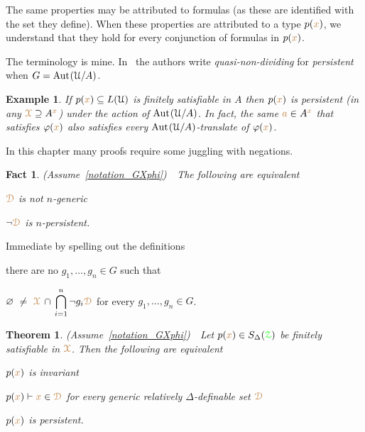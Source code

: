 \documentclass[10pt,openany]{amsproc}
\makeatletter
\newcommand{\mylabel}[1]{{\ssf{#1}}\hfill}
\renewenvironment{itemize}
  {\begin{list}{}{%
   \setlength{\parskip}{0mm}
   \setlength{\topsep}{.2\baselineskip}
   \setlength{\rightmargin}{0mm}
   \setlength{\listparindent}{0mm}
   \setlength{\itemindent}{0mm}
   \setlength{\labelwidth}{2ex}
   \setlength{\itemsep}{.1\baselineskip}
   \setlength{\parsep}{0mm}
   \setlength{\partopsep}{0mm}
   \setlength{\labelsep}{1ex}
   \setlength{\leftmargin}{\labelwidth+\labelsep}
   \let\makelabel\mylabel
   }}
   {\vspace*{-.3\baselineskip}\end{list}}
\def\proves{\vdash}
\def\Aut{{\rm Aut\kern.15ex}}
\def\D{\EuScript D}
\def\X{\EuScript X}
\def\Z{\EuScript Z}
\def\U{\EuScript U}
\def\0{\varnothing}
\def\phi{\varphi}
\def\ssf#1{\textsf{\small #1}}
\newcounter{thm}
\theoremstyle{mio}
\newtheorem{theorem}[thm]{Theorem}\tcolorboxenvironment{theorem}{mythm}
\newtheorem{fact}[thm]{Fact}\tcolorboxenvironment{fact}{mythm}
\newtheorem{example}[thm]{Example}\tcolorboxenvironment{example}{mythm}
\providecommand{\proofNameStyle}{\bfseries}
\renewenvironment{proof}[1][\proofname]{\par
  \pushQED{\qed}%
  \normalfont%
  \trivlist
  \item[\hskip\labelsep
        \proofNameStyle
    #1\@addpunct{.}]\ignorespaces
}{%
  \popQED\endtrivlist\@endpefalse
}
\def\mr{\color{brown}}
\def\gr{\color{green}}
\def\mrD{{\mr\D}}
\def\mrX{{\mr\X}}
\def\grZ{{\gr\Z}}
\makeatother
\begin{document}
The same properties may be attributed to formulas (as these are identified with the set they define).
When these properties are attributed to a type $p({\mr x})$, we understand that they hold for every conjunction of formulas in $p({\mr x})$.

The terminology is mine.
In~\cite{CK} the authors write \textit{quasi-non-dividing\/} for \textit{persistent\/} when $G=\Aut(\U/A)$.

\begin{example}
  If $p({\mr x})\subseteq L(\U)$ is finitely satisfiable in $A$ then $p({\mr x})$ is persistent (in any $\mrX\supseteq A^{\mr x}$) under the action of $\Aut(\U/A)$.
  In fact, the same ${\mr a}\in A^{\mr x}$ that satisfies $\phi({\mr x})$ also satisfies every $\Aut(\U/A)$-translate of $\phi({\mr x})$.
\end{example}

In this chapter many proofs require some juggling with negations.

\begin{fact}\label{fact_fip}
  (Assume~\ref{notation_GXphi})\ \  
  The following are equivalent
  \begin{itemize}
    \item[1.] $\mrD$ is not $n$-generic
    \item[2.] $\neg\mrD$ is $n$-persistent.
  \end{itemize}
\end{fact}

\begin{proof}
  Immediate by spelling out the definitions\smallskip
  \begin{itemize}
    \item[1.] there are no $g_1,\dots,g_n\in G$ such that \smash{$\displaystyle\mrX\ \subseteq\ \bigcup_{i=1}^n g_i{\mr\D}$}
    \item[2.]  $\displaystyle\0\ \neq\ \mrX\,\cap\,\bigcap_{i=1}^n\neg g_i{\mr\D}$ for every $g_1,\dots,g_n\in G$.\qedhere
  \end{itemize} 
\end{proof}

\begin{theorem}\label{thm_generic_invariant}
  (Assume~\ref{notation_GXphi})\ \  
  Let $p({\mr x})\in S_\Delta(\grZ)$ be finitely satisfiable in $\mrX$.
  Then the following are equivalent
  \begin{itemize}
    \item[1.] $p({\mr x})$ is invariant
    \item[2.] $p({\mr x})\proves{\mr x}\in\mrD$ for every generic relatively $\Delta$-definable set $\mrD$
    \item[3.] $p({\mr x})$ is persistent.
  \end{itemize}
\end{theorem}
\end{document}
